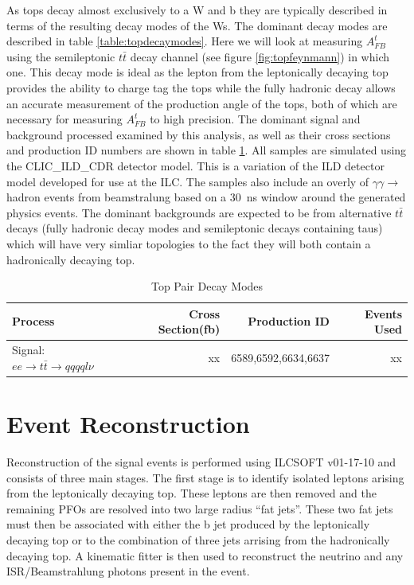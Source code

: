 As tops decay almost exclusively to a W and b they are typically described in terms of the resulting decay modes of the Ws. The dominant decay modes are described in table \ref{table:topdecaymodes}. Here we will look at measuring $A_{FB}^{t}$ using the semileptonic $t\bar{t}$ decay channel (see figure \ref{fig:topfeynmann}) in which one. This decay mode is ideal as the lepton from the leptonically decaying top provides the ability to charge tag the tops while the fully hadronic decay allows an accurate measurement of the production angle of the tops, both of which are necessary for measuring $A_{FB}^{t}$ to high precision. The dominant signal and background processed examined by this analysis, as well as their cross sections and production ID numbers are shown in table \ref{table:topsamples}. All samples are simulated using the CLIC\_ILD\_CDR detector model. This is a variation of the ILD detector model developed for use at the ILC. The samples also include an overly of $\gamma\gamma\rightarrow$ hadron events from beamstralung based on a 30~ns window around the generated physics events. The dominant backgrounds are expected to be from alternative $t\bar{t}$ decays (fully hadronic decay modes and semileptonic decays containing taus) which will have very simliar topologies to the fact they will both contain a hadronically decaying top.

\begin{table}
  \centering
  \begin{tabular}{l | r | r |r}
    \toprule
    Process     & Cross Section(fb) & Production ID & Events Used  \\
    \midrule
    Signal: $ee\rightarrow t\bar{t}\rightarrow qqqql\nu$ & xx & 6589,6592,6634,6637 & xx \\
    \bottomrule
  \end{tabular}
  \caption{Top Pair Decay Modes}
  \label{table:topsamples}
\end{table}


\section{Event Reconstruction}
Reconstruction of the signal events is performed using ILCSOFT v01-17-10 and consists of three main stages. The first stage is to identify isolated leptons arising from the leptonically decaying top. These leptons are then removed and the remaining PFOs are resolved into two large radius ``fat jets''. These two fat jets must then be associated with either the b jet produced by the leptonically decaying top or to the combination of three jets arrising from the hadronically decaying top. A kinematic fitter is then used to reconstruct the neutrino and any ISR/Beamstrahlung photons present in the event.

